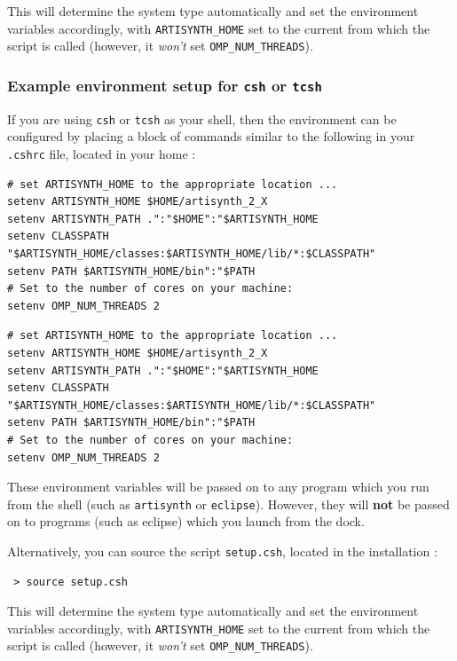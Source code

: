 This will determine the system type automatically and set the
environment variables accordingly, with {\tt ARTISYNTH\_HOME} set to the
current \directory{} from which the script is called (however,
it {\it won't} set {\tt OMP\_NUM\_THREADS}).

\subsubsection{Example environment setup for {\tt csh} or {\tt tcsh}}
\label{CshEnvironmentSetup}

If you are using {\tt csh} or {\tt tcsh} as your shell, then the
environment can be configured by placing a block of commands similar
to the following in your {\tt .cshrc} file, located in your home
\directory{}:

\ifLinux
\begin{lstlisting}[]
# set ARTISYNTH_HOME to the appropriate location ...
setenv ARTISYNTH_HOME $HOME/artisynth_2_X
setenv ARTISYNTH_PATH .":"$HOME":"$ARTISYNTH_HOME
setenv CLASSPATH "$ARTISYNTH_HOME/classes:$ARTISYNTH_HOME/lib/*:$CLASSPATH"
setenv PATH $ARTISYNTH_HOME/bin":"$PATH
# Set to the number of cores on your machine:
setenv OMP_NUM_THREADS 2 
\end{lstlisting}
\else\ifMacOS
\begin{lstlisting}[]
# set ARTISYNTH_HOME to the appropriate location ...
setenv ARTISYNTH_HOME $HOME/artisynth_2_X
setenv ARTISYNTH_PATH .":"$HOME":"$ARTISYNTH_HOME
setenv CLASSPATH "$ARTISYNTH_HOME/classes:$ARTISYNTH_HOME/lib/*:$CLASSPATH"
setenv PATH $ARTISYNTH_HOME/bin":"$PATH
# Set to the number of cores on your machine:
setenv OMP_NUM_THREADS 2 
\end{lstlisting}
\fi %
\fi %

These environment variables will be passed on to any program which you
run from the shell (such as {\tt artisynth} or {\tt eclipse}).
\ifMacOS
However, they will {\bf not} be passed on to programs (such as eclipse)
which you launch from the dock.
\fi

Alternatively, you can source the script {\tt setup.csh}, located in
the installation \directory{}:

\begin{verbatim}
 > source setup.csh
\end{verbatim}

This will determine the system type automatically and set the
environment variables accordingly, with {\tt ARTISYNTH\_HOME} set to the
current \directory{} from which the script is called (however,
it {\it won't} set {\tt OMP\_NUM\_THREADS}).
\fi %

